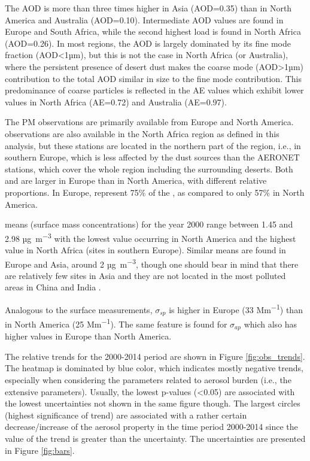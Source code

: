 \documentclass[acp, manuscript]{copernicus}
\begin{document}
The AOD is more than three times higher in Asia (AOD=0.35) than in North America and Australia (AOD=0.10). Intermediate AOD values are found in Europe and South Africa, while the second highest load is found in North Africa (AOD=0.26). In most regions, the AOD is largely dominated by its fine mode fraction (AOD<1µm), but this is not the case in North Africa (or Australia), where the persistent presence of desert dust makes the coarse mode (AOD>1µm) contribution to the total AOD similar in size to the fine mode contribution. This predominance of coarse particles is reflected in the AE values which exhibit lower values in North Africa (AE=0.72) and Australia (AE=0.97).

The PM observations are primarily available from Europe and North America.  observations are also available in the North Africa region as defined in this analysis, but these stations are  located in the northern part of the region, i.e., in southern Europe, which is less affected by the dust sources than the AERONET stations, which cover the whole region including the surrounding deserts. Both  and  are larger in Europe than in North America, with different relative proportions. In Europe,  represent 75\% of the , as compared to only 57\% in North America.

 means (surface mass concentrations) for the year 2000 range between 1.45 and 2.98 \unit{µg.m^{-3}} with the lowest value occurring in North America and the highest value in North Africa (sites in southern Europe). Similar means are found in Europe and Asia, around 2 \unit{µg.m^{-3}}, though one should bear in mind that there are relatively few sites in Asia and they are not located in the most polluted areas in China and India \citep{aas2019global}.

Analogous to the surface  measurements, $\sigma_{sp}$ is higher in Europe (33 \unit{Mm^{-1}}) than in North America (25 \unit{Mm^{-1}}). The same feature is found for $\sigma_{ap}$ which also has higher values in Europe than North America.



The relative trends for the 2000-2014 period are shown in Figure \ref{fig:obs_trends}. The heatmap is dominated by blue color, which indicates mostly negative trends, especially when considering the parameters related to aerosol burden (i.e., the extensive parameters). Usually, the lowest p-values (<0.05) are associated with the lowest uncertainties not shown in the same figure though. The largest circles (highest significance of trend) are associated with a rather certain decrease/increase of the aerosol property in the time period 2000-2014 since the value of the trend is greater than the uncertainty. The uncertainties are presented in Figure \ref{fig:bars}.
\end{document}
